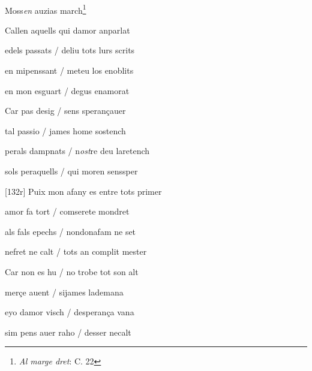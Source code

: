 \documentclass[12pt]{article}
\renewcommand{\espaiAbansEtiquetaPoema}{\vspace{0ex}}
\begin{document}
\begin{estrofa}

\espaiAbansEtiquetaPoema

\\

\begin{rubrica}

Moss\textit{en} auzias march\footnote{\textit{Al marge dret}: C. 22}

\end{rubrica}

\end{estrofa}


\begin{estrofa}

 Callen aquells qui damor anparlat

 edels passats / deliu tots lurs scrits

 en mipenssant / meteu los enoblits

 en mon esguart / degus enamorat

 Car pas desig / sens speran\c{c}auer

 tal passio / james home sostench

 perals dampnats / n\textit{ost}re deu laretench

 sols peraquells / qui moren senssper

\end{estrofa}



\begin{estrofa}

 [132r] Puix mon afany es entre tots primer

 amor fa tort / comserete mondret

 als fals epechs / nondonafam ne set

 nefret ne calt / tots an complit mester

 Car non es hu / no trobe tot son alt

 mer\c{c}e auent / sijames lademana

 eyo damor visch / desperan\c{c}a vana

 sim pens auer raho / desser necalt

\end{estrofa}
\end{document}
